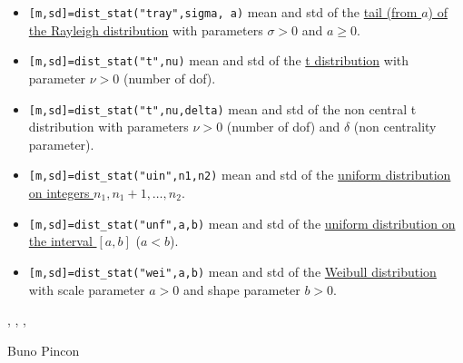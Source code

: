\begin{mandescription}
\begin{itemize}
\item {} \verb![m,sd]=dist_stat("tray",sigma, a)! mean and std 
of the \hyperlink{traypdf}{tail (from $a$) of the Rayleigh distribution} with parameters $\sigma > 0$ 
and $a \ge 0$.

\item {} \verb![m,sd]=dist_stat("t",nu)! mean and std of 
the \hyperlink{tpdf}{t distribution} with parameter $\nu > 0$ (number of dof).


\item {} \verb![m,sd]=dist_stat("t",nu,delta)! 
mean and std of the non central t distribution with parameters $\nu > 0$ (number of dof) and
$\delta$ (non centrality parameter).


\item {} \verb![m,sd]=dist_stat("uin",n1,n2)! mean and std 
of the \hyperlink{uinpdf}{uniform distribution on integers $n_1,n_1+1,\dots,n_2$}.

\item {} \verb![m,sd]=dist_stat("unf",a,b)! mean and std  
of the \hyperlink{unfpdf}{uniform distribution on the interval $[a,b]$} ($a < b$).

\item {} \verb![m,sd]=dist_stat("wei",a,b)! mean and std of 
the \hyperlink{weipdf}{Weibull  distribution} with scale parameter $a > 0$ and shape parameter $b > 0$.

\end{itemize}

\end{mandescription}


\begin{manseealso}
  , , , 
\end{manseealso}


\begin{authors}
  Buno Pincon
\end{authors}


